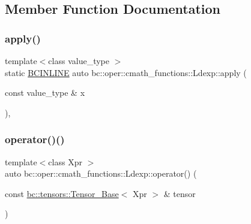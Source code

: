 \subsection{Member Function Documentation}
\mbox{\label{structbc_1_1oper_1_1cmath__functions_1_1Ldexp_a4fd0a2ade9f8d32291421397da4f1ac5}} 
\subsubsection{\texorpdfstring{apply()}{apply()}}
{\footnotesize\ttfamily template$<$class value\+\_\+type $>$ \\
static \hyperlink{common_8h_a6699e8b0449da5c0fafb878e59c1d4b1}{B\+C\+I\+N\+L\+I\+NE} auto bc\+::oper\+::cmath\+\_\+functions\+::\+Ldexp\+::apply (\begin{DoxyParamCaption}\item[{const value\+\_\+type \&}]{x }\end{DoxyParamCaption})\hspace{0.3cm}{\ttfamily [inline]}, {\ttfamily [static]}}

\mbox{\label{structbc_1_1oper_1_1cmath__functions_1_1Ldexp_ad5cbefc8f4e2945e253598329f30911a}} 
\subsubsection{\texorpdfstring{operator()()}{operator()()}\hspace{0.1cm}{\footnotesize\ttfamily [1/3]}}
{\footnotesize\ttfamily template$<$class Xpr $>$ \\
auto bc\+::oper\+::cmath\+\_\+functions\+::\+Ldexp\+::operator() (\begin{DoxyParamCaption}\item[{const \hyperlink{classbc_1_1tensors_1_1Tensor__Base}{bc\+::tensors\+::\+Tensor\+\_\+\+Base}$<$ Xpr $>$ \&}]{tensor }\end{DoxyParamCaption})\hspace{0.3cm}{\ttfamily [inline]}}

